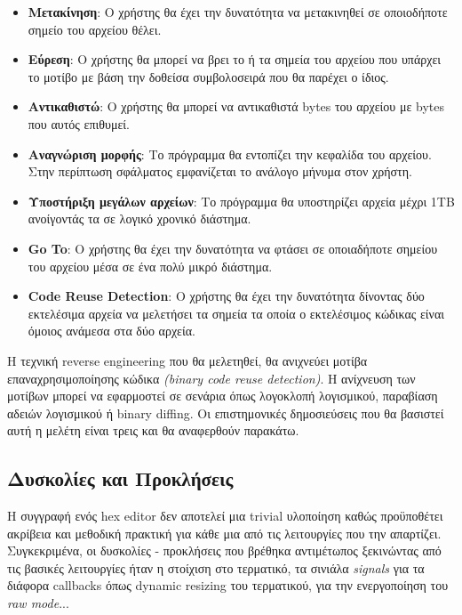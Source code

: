 \begin{itemize}
    \item \textbf{Μετακίνηση}: Ο χρήστης θα έχει την δυνατότητα να μετακινηθεί σε οποιοδήποτε σημείο του αρχείου θέλει.
    
    \item \textbf{Εύρεση}: Ο χρήστης θα μπορεί να βρει το ή τα σημεία του αρχείου που υπάρχει το μοτίβο με βάση την δοθείσα συμβολοσειρά που θα παρέχει ο ίδιος.
    
    \item \textbf{Αντικαθιστώ}: Ο χρήστης θα μπορεί να αντικαθιστά bytes του αρχείου με bytes που αυτός επιθυμεί.
    
    \item \textbf{Αναγνώριση μορφής}: Το πρόγραμμα θα εντοπίζει την κεφαλίδα του αρχείου. Στην περίπτωση σφάλματος εμφανίζεται το ανάλογο μήνυμα στον χρήστη. 
    
    \item \textbf{Υποστήριξη μεγάλων αρχείων}: Το πρόγραμμα θα υποστηρίζει αρχεία μέχρι 1TB ανοίγοντάς τα σε λογικό χρονικό διάστημα.
    
    \item \textbf{Go To}: Ο χρήστης θα έχει την δυνατότητα να φτάσει σε οποιαδήποτε σημείου του αρχείου μέσα σε ένα πολύ μικρό διάστημα.

    \item \textbf{Code Reuse Detection}: Ο χρήστης θα έχει την δυνατότητα δίνοντας δύο εκτελέσιμα αρχεία να μελετήσει τα σημεία τα οποία ο εκτελέσιμος κώδικας είναι όμοιος ανάμεσα στα δύο αρχεία.

\end{itemize}

Η τεχνική reverse engineering που θα μελετηθεί, θα ανιχνεύει μοτίβα επαναχρησιμοποίησης κώδικα \emph{(binary code reuse detection)}.
Η ανίχνευση των μοτίβων μπορεί να εφαρμοστεί σε σενάρια όπως λογοκλοπή λογισμικού, παραβίαση αδειών λογισμικού ή binary diffing.
Οι επιστημονικές δημοσιεύσεις που θα βασιστεί αυτή η μελέτη είναι τρεις και θα αναφερθούν παρακάτω.

\pagebreak

\subsection{Δυσκολίες και Προκλήσεις}
Η συγγραφή ενός hex editor δεν αποτελεί μια trivial υλοποίηση καθώς προϋποθέτει ακρίβεια και μεθοδική πρακτική για κάθε μια από τις λειτουργίες που την απαρτίζει.
Συγκεκριμένα, οι δυσκολίες - προκλήσεις που βρέθηκα αντιμέτωπος ξεκινώντας από τις βασικές λειτουργίες ήταν η στοίχιση στο τερματικό, τα σινιάλα \emph{signals} για τα διάφορα callbacks όπως dynamic resizing του τερματικού, για την ενεργοποίηση του \emph{raw mode}...


